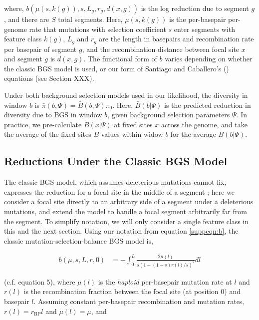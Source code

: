 \documentclass[11pt]{article}
\begin{document}
where, $b(\mu(s, k(g)), s, L_g, r_g, d(x,g))$ is the log reduction due to
segment $g$, and there are $S$ total segments. Here, $\mu(s, k(g))$ is the
per-basepair per-genome rate that mutations with selection coefficient $s$
enter segments with feature class $k(g)$, $L_g$ and $r_g$ are the length in
basepairs and recombination rate per basepair of segment $g$, and the
recombination distance between focal site $x$ and segment $g$ is $d(x, g)$. The
functional form of $b$ varies depending on whether the classic BGS model is
used, or our form of Santiago and Caballero's (\citeyear{Santiago2016-mu})
equations (see Section XXX).

Under both background selection models used in our likelihood, the diversity in
window $b$ is $\bar{\pi}(b, \Psi) = \bar{B}(b, \Psi) \pi_0$. Here, $\bar{B}(b |
\Psi)$ is the predicted reduction in diversity due to BGS in window $b$, given
background selection parameters $\Psi$. In practice, we pre-calculate $B(x |
\Psi)$ at fixed sites $x$ across the genome, and take the average of the fixed
sites $B$ values within widow $b$ for the average $\bar{B}(b | \Psi)$. 

\subsection{Reductions Under the Classic BGS Model}

The classic BGS model, which assumes deleterious mutations cannot fix,
expresses the reduction for a focal site in the middle of a segment
\parencite{Hudson1995-xc,Hudson1994-oh,Nordborg1996-nq}; here we consider a
focal site directly to an arbitrary side of a segment under a deleterious
mutations, and extend the model to handle a focal segment arbitrarily far from
the segment. To simplify notation, we will only consider a single feature class
in this and the next section. Using our notation from equation
\eqref{suppeqn:b}, the classic mutation-selection-balance BGS model is,

\begin{align}
  b(\mu, s, L, r, 0) &=  - \int_0^L \frac{2\mu(l)}{s (1 + (1-s) r(l)/s)^2} dl 
\end{align}
 
(c.f. \cite{Hudson1995-xc} equation 5), where $\mu(l)$ is the \emph{haploid}
per-basepair mutation rate at $l$ and $r(l)$ is the recombination fraction
between the focal site (at position 0) and basepair $l$. Assuming constant
per-basepair recombination and mutation rates, $r(l) = r_\text{BP}l$ and
$\mu(l) = \mu$, and
\end{document}
